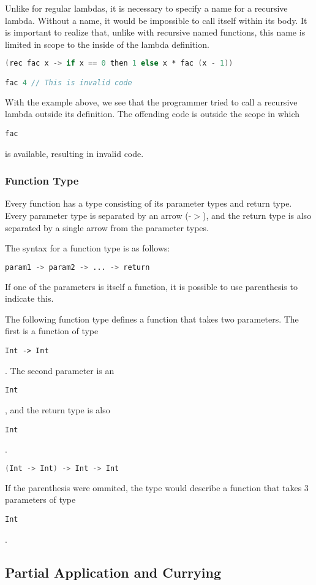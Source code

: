 \documentclass{article}
\def\code#1{\begin{footnotesize}\texttt{#1}\end{footnotesize}}
\begin{document}
Unlike for regular lambdas, it is necessary to specify a name for a recursive lambda.
Without a name, it would be impossible to call itself within its body.
It is important to realize that, unlike with recursive named functions, this name is limited in scope to the inside of the lambda definition.

\begin{lstlisting}[language=V]
(rec fac x -> if x == 0 then 1 else x * fac (x - 1))

fac 4 // This is invalid code
\end{lstlisting}

With the example above, we see that the programmer tried to call a recursive lambda outside its definition.
The offending code is outside the scope in which \code{fac} is available, resulting in invalid code.

\subsubsection{Function Type}\label{Function Type}

Every function has a type consisting of its parameter types and return type.
Every parameter type is separated by an arrow (-$>$), and the return type is also separated by a single arrow from the parameter types.

The syntax for a function type is as follows:
\begin{lstlisting}[language=V]
  param1 -> param2 -> ... -> return
\end{lstlisting}

\smallskip

 If one of the parameters is itself a function, it is possible to use parenthesis to indicate this.

The following function type defines a function that takes two parameters.
The first is a function of type \code{Int -> Int}.
The second parameter is an \code{Int}, and the return type is also \code{Int}.

 \begin{lstlisting}[language=V]
   (Int -> Int) -> Int -> Int
 \end{lstlisting}

If the parenthesis were ommited, the type would describe a function that takes 3 parameters of type \code{Int}.

\subsection{Partial Application and Currying}
\end{document}
